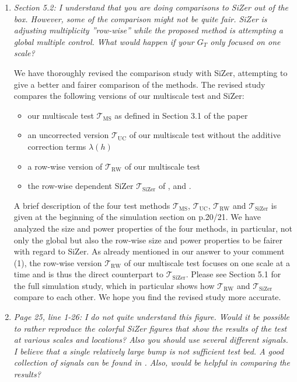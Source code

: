 \documentclass[a4paper,12pt]{article}
\begin{document}
\begin{enumerate}[label=(\arabic*),leftmargin=0.7cm]
\item \textit{Section 5.2: I understand that you are doing comparisons to SiZer out of the box. However, some of the comparison might not be quite fair. SiZer is adjusting multiplicity ”row-wise” while the proposed method is attempting a global multiple control. What would happen if your $G_T$ only focused on one scale?}

We have thoroughly revised the comparison study with SiZer, attempting to give a better and fairer comparison of the methods. The revised study compares the following versions of our multiscale test and SiZer: 
\begin{itemize}[leftmargin=0.5cm,itemsep=0cm]

\item our multiscale test $\mathcal{T}_{\text{MS}}$ as defined in Section 3.1 of the paper 
\item an uncorrected version $\mathcal{T}_{\text{UC}}$ of our multiscale test without the additive correction terms $\lambda(h)$ 
\item a row-wise version of $\mathcal{T}_{\text{RW}}$ of our multiscale test 
\item the row-wise dependent SiZer $\mathcal{T}_{\text{SiZer}}$ of \cite{Rondonotti2004}, \cite{Rondonotti2007} and \cite{ParkHannigKang2009}. 

\end{itemize}
A brief description of the four test methods $\mathcal{T}_{\text{MS}}$, $\mathcal{T}_{\text{UC}}$, $\mathcal{T}_{\text{RW}}$ and $\mathcal{T}_{\text{SiZer}}$ is given at the beginning of the simulation section on p.20/21. We have analyzed the size and power properties of the four methods, in particular, not only the global but also the row-wise size and power properties to be fairer with regard to SiZer. As already mentioned in our answer to your comment (1), the row-wise version $\mathcal{T}_{\text{RW}}$ of our multiscale test focuses on one scale at a time and is thus the direct counterpart to $\mathcal{T}_{\text{SiZer}}$. Please see Section 5.1 for the full simulation study, which in particular shows how $\mathcal{T}_{\text{RW}}$ and $\mathcal{T}_{\text{SiZer}}$ compare to each other. We hope you find the revised study more accurate.


\item \textit{Page 25, line 1-26: I do not quite understand this figure. Would it be possible to rather reproduce the colorful SiZer figures that show the results of the test at various scales and locations? Also you should use several different signals. I believe that a single relatively large bump is not sufficient test bed. A good collection of signals can be found in \cite{DonohoJohnstone1995}. Also, would \cite{HannigLeePark2013} be helpful in comparing the results?}


\end{enumerate}
\end{document}
